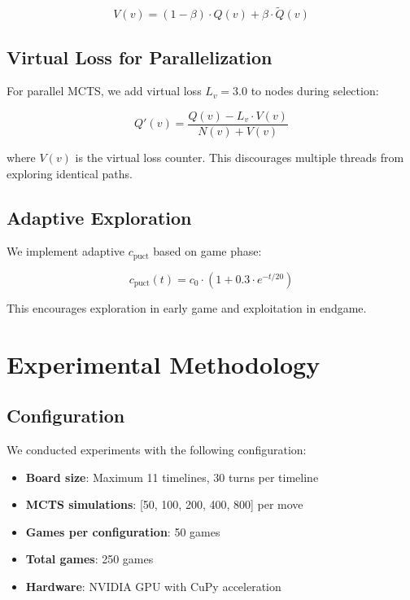 \documentclass[11pt,a4paper]{article}
\begin{document}
\begin{equation}
V(v) = (1 - \beta) \cdot Q(v) + \beta \cdot \tilde{Q}(v)
\end{equation}

\subsection{Virtual Loss for Parallelization}

For parallel MCTS, we add virtual loss $L_v = 3.0$ to nodes during selection:

\begin{equation}
Q'(v) = \frac{Q(v) - L_v \cdot V(v)}{N(v) + V(v)}
\end{equation}

where $V(v)$ is the virtual loss counter. This discourages multiple threads from exploring identical paths.

\subsection{Adaptive Exploration}

We implement adaptive $c_{\text{puct}}$ based on game phase:

\begin{equation}
c_{\text{puct}}(t) = c_0 \cdot \left(1 + 0.3 \cdot e^{-t/20}\right)
\end{equation}

This encourages exploration in early game and exploitation in endgame.

\section{Experimental Methodology}

\subsection{Configuration}

We conducted experiments with the following configuration:
\begin{itemize}
    \item \textbf{Board size}: Maximum 11 timelines, 30 turns per timeline
    \item \textbf{MCTS simulations}: [50, 100, 200, 400, 800] per move
    \item \textbf{Games per configuration}: 50 games
    \item \textbf{Total games}: 250 games
    \item \textbf{Hardware}: NVIDIA GPU with CuPy acceleration
\end{itemize}
\end{document}
